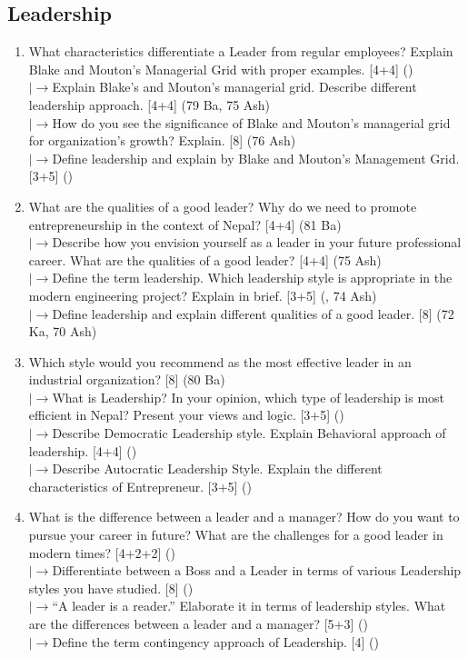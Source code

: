 \documentclass[12pt]{article}
\newcommand{\lb}{\\$\left|\rightarrow\right.$}
\begin{document}
  \subsection{Leadership}
    \begin{enumerate}[topsep=0pt, noitemsep]
      \item What characteristics differentiate a Leader from regular employees? Explain Blake and Mouton's Managerial Grid with proper examples. \hfill [4+4] ()
        \lb Explain Blake's and Mouton's managerial grid. Describe different leadership approach. \hfill [4+4] (79 Ba, 75 Ash)
        \lb How do you see the significance of Blake and Mouton's managerial grid for organization's growth? Explain. \hfill [8] (76 Ash)
        \lb Define leadership and explain by Blake and Mouton's Management Grid. \hfill [3+5] ()

      \item What are the qualities of a good leader? Why do we need to promote entrepreneurship in the context of Nepal? \hfill [4+4] (81 Ba)
        \lb Describe how you envision yourself as a leader in your future professional career. What are the qualities of a good leader? \hfill [4+4] (75 Ash)
        \lb Define the term leadership. Which leadership style is appropriate in the modern engineering project? Explain in brief. \hfill [3+5] (, 74 Ash)
        \lb Define leadership and explain different qualities of a good leader. \hfill [8] (72 Ka, 70 Ash)

      \item Which style would you recommend as the most effective leader in an industrial organization? \hfill [8] (80 Ba)
        \lb What is Leadership? In your opinion, which type of leadership is most efficient in Nepal? Present your views and logic. \hfill [3+5] ()
        \lb Describe Democratic Leadership style. Explain Behavioral approach of leadership. \hfill [4+4] ()
        \lb Describe Autocratic Leadership Style. Explain the different characteristics of Entrepreneur. \hfill [3+5] ()

      \item What is the difference between a leader and a manager? How do you want to pursue your career in future? What are the challenges for a good leader in modern times? \hfill [4+2+2] ()
        \lb Differentiate between a Boss and a Leader in terms of various Leadership styles you have studied. \hfill [8] ()
        \lb ``A leader is a reader.'' Elaborate it in terms of leadership styles. What are the differences between a leader and a manager? \hfill [5+3] ()
        \lb Define the term contingency approach of Leadership. \hfill [4] ()
    \end{enumerate}
\end{document}
